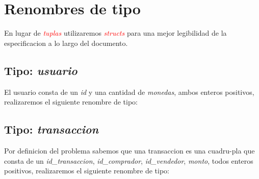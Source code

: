 \documentclass[10pt,a4paper]{article}
\begin{document}
    \maketitle

    \section{Renombres de tipo}
    En lugar de \textcolor{red}{\textit{tuplas}} utilizaremos \textcolor{red}{\textit{structs}} para una mejor legibilidad de la especificacion a lo largo del documento.

    \subsection{Tipo: \textit{usuario}}
    El usuario consta de un \textit{id} y una cantidad de \textit{monedas}, ambos enteros positivos, realizaremos el siguiente renombre de tipo:

    \vspace{0.3cm}
    \noindent
    \vspace{0.1cm}

    \subsection{Tipo: \textit{transaccion}}
    Por definicion del problema sabemos que una transaccion es una cuadru-pla que consta de un \textit{id\_transaccion}, \textit{id\_comprador}, \textit{id\_vendedor}, \textit{monto}, todos enteros positivos, realizaremos el siguiente renombre de tipo:

    \vspace{0.3cm}
    \noindent
    \vspace{0.1cm}
\end{document}
